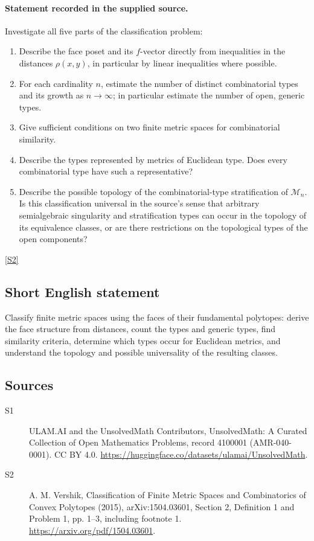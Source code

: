 \documentclass[11pt]{article}
\newcommand{\sref}[2]{\hyperlink{source:#1:#2}{[S#2]}}
\begin{document}
\paragraph{Statement recorded in the supplied source.}
Investigate all five parts of the classification problem:
\begin{enumerate}
\item Describe the face poset and its \(f\)-vector directly from inequalities in the distances \(\rho(x,y)\), in particular by linear inequalities where possible.
\item For each cardinality \(n\), estimate the number of distinct combinatorial types and its growth as \(n\to\infty\); in particular estimate the number of open, generic types.
\item Give sufficient conditions on two finite metric spaces for combinatorial similarity.
\item Describe the types represented by metrics of Euclidean type. Does every combinatorial type have such a representative?
\item Describe the possible topology of the combinatorial-type stratification of \(\mathcal M_n\). Is this classification universal in the source's sense that arbitrary semialgebraic singularity and stratification types can occur in the topology of its equivalence classes, or are there restrictions on the topological types of the open components?
\end{enumerate} \sref{4100001}{2}
\subsection{Short English statement}
Classify finite metric spaces using the faces of their fundamental polytopes: derive the face structure from distances, count the types and generic types, find similarity criteria, determine which types occur for Euclidean metrics, and understand the topology and possible universality of the resulting classes.
\subsection{Sources}
\begin{description}
\item[\hypertarget{source:4100001:1}{S1}] ULAM.AI and the UnsolvedMath Contributors, UnsolvedMath: A Curated Collection of Open Mathematics Problems, record 4100001 (AMR-040-0001). CC BY 4.0. \url{https://huggingface.co/datasets/ulamai/UnsolvedMath}.
\item[\hypertarget{source:4100001:2}{S2}] A. M. Vershik, Classification of Finite Metric Spaces and Combinatorics of Convex Polytopes (2015), arXiv:1504.03601, Section 2, Definition 1 and Problem 1, pp. 1–3, including footnote 1. \url{https://arxiv.org/pdf/1504.03601}.
\end{description}
\label{end:4100001}
\end{document}
